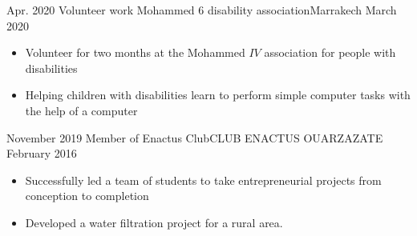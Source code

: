 %
%
%

\begin{experiences}

  \experience
    {Apr. 2020} {Volunteer work} %
    {Mohammed 6 disability association}{Marrakech}
    {March 2020} {
                      \begin{itemize}
						\item Volunteer for two months at the Mohammed $IV$ association for people with disabilities
						\item Helping children with disabilities learn to perform simple computer tasks with the help of a computer 
                      \end{itemize}
                      }
                    {}
  \emptySeparator       
  \experience
  {November 2019} {Member of Enactus Club}{CLUB ENACTUS OUARZAZATE}{}
  {February 2016} {
                      \begin{itemize}
						\item Successfully led a team of students to take entrepreneurial projects from conception to completion
						\item Developed a water filtration project for a rural area.				   
                      \end{itemize}
                  }
                  {}  
\end{experiences}


